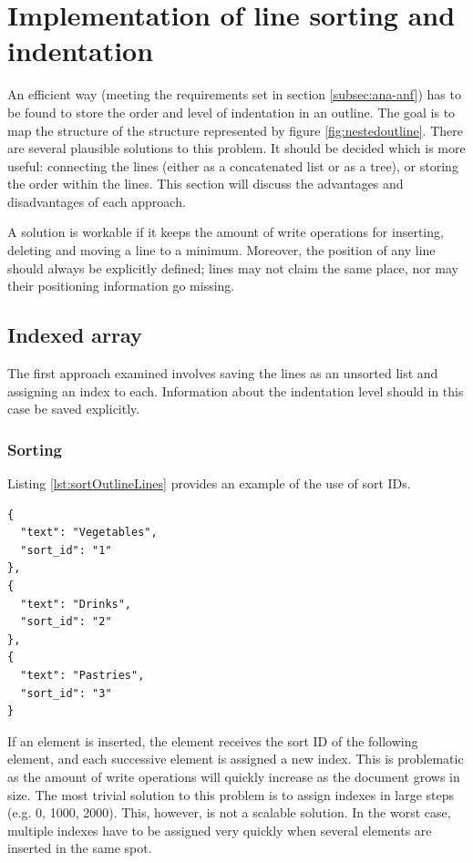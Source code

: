 \section{Implementation of line sorting and indentation}
\label{sec:sortierung}

An efficient way (meeting the requirements set in section \ref{subsec:ana-anf}) has to be found to store the order and level of indentation in an outline. The goal is to map the structure of the structure represented by figure \ref{fig:nestedoutline}. There are several plausible solutions to this problem. It should be decided which is more useful: connecting the lines (either as a concatenated list or as a tree), or storing the order within the lines. This section will discuss the advantages and disadvantages of each approach.

A solution is workable if it keeps the amount of write operations for inserting, deleting and moving a line to a minimum. Moreover, the position of any line should always be explicitly defined; lines may not claim the same place, nor may their positioning information go missing.

\subsection{Indexed array}
\label{subsec:array}

The first approach examined involves saving the lines as an unsorted list and assigning an index to each. Information about the indentation level should in this case be saved explicitly.

\subsubsection{Sorting}

Listing \ref{lst:sortOutlineLines} provides an example of the use of sort IDs.

\medskip
\begin{lstlisting}[caption=Three lines with a simple index, label={lst:sortOutlineLines}]
{
  "text": "Vegetables",
  "sort_id": "1"
},
{
  "text": "Drinks",
  "sort_id": "2"
},
{
  "text": "Pastries",
  "sort_id": "3"
}
\end{lstlisting}

If an element is inserted, the element receives the {\selectfont sort ID} of the following element, and each successive element is assigned a new index. This is problematic as the amount of write operations will quickly increase as the document grows in size. The most trivial solution to this problem is to assign indexes in large steps (e.g. 0, 1000, 2000). This, however, is not a scalable solution. In the worst case, multiple indexes have to be assigned very quickly when several elements are inserted in the same spot.

